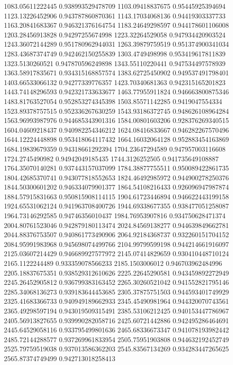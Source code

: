 {1083.05611222445 0.938993529478709
1103.09418837675 0.95445925394694
1123.13226452906 0.943787860870361
1143.17034068136 0.94419303337733
1163.20841683367 0.946321376164754
1183.24649298597 0.944178601106008
1203.28456913828 0.94297255674998
1223.32264529058 0.947934420903524
1243.36072144289 0.951780962944031
1263.39879759519 0.951374900341034
1283.43687374749 0.942462150255839
1303.4749498998 0.953419617811839
1323.5130260521 0.947870596249898
1343.55110220441 0.947534497578939
1363.58917835671 0.934315168857574
1383.62725450902 0.949537491798401
1403.66533066132 0.94277339776357
1423.70340681363 0.942315165201823
1443.74148296593 0.942321733633677
1463.77955911824 0.946663800875346
1483.81763527054 0.952853274345398
1503.85571142285 0.9419047554334
1523.89378757515 0.952336267630259
1543.93186372745 0.948626108964284
1563.96993987976 0.944685343901316
1584.00801603206 0.928376269340515
1604.04609218437 0.940982254346212
1624.08416833667 0.946282267570496
1644.12224448898 0.953418064117432
1664.16032064128 0.952883454163869
1684.19839679359 0.94318661292394
1704.23647294589 0.947957003116608
1724.2745490982 0.94942049185435
1744.3126252505 0.941735649108887
1764.35070140281 0.937443157037099
1784.38877755511 0.950089422861735
1804.42685370741 0.943077818552653
1824.46492985972 0.944900278250376
1844.50300601202 0.946334079901377
1864.54108216433 0.926096947987874
1884.57915831663 0.950815908114115
1904.61723446894 0.946622443199158
1924.65531062124 0.941963708400726
1944.69338677355 0.938477051258087
1964.73146292585 0.94746356010437
1984.76953907816 0.934750628471374
2004.80761523046 0.942879180113474
2024.84569138277 0.944639849662781
2044.88376753507 0.940861773490906
2064.92184368737 0.932260151704152
2084.95991983968 0.945698074499766
2104.99799599198 0.944214661916097
2125.03607214429 0.946689927577972
2145.07414829659 0.930410448710124
2165.1122244489 0.933359078566233
2185.1503006012 0.946703962484996
2205.18837675351 0.938529312610626
2225.22645290581 0.943459892272949
2245.26452905812 0.936799383163452
2265.30260521042 0.941552821795146
2285.34068136273 0.939183644453685
2305.37875751503 0.944593401749929
2325.41683366733 0.940949189662933
2345.45490981964 0.944320070743561
2365.49298597194 0.943019509315491
2385.53106212425 0.940153447786967
2405.56913827655 0.939990282058716
2425.60721442886 0.942495286464691
2445.64529058116 0.933795499801636
2465.68336673347 0.941078193982442
2485.72144288577 0.937269961833954
2505.75951903808 0.944632192452749
2525.79759519038 0.937013586362203
2545.83567134269 0.934283447265625
2565.87374749499 0.942713018258413
}
